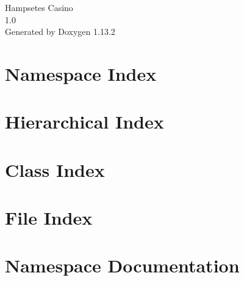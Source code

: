 \documentclass[twoside]{book}
\newcommand{\+}{\discretionary{\mbox{\scriptsize$\hookleftarrow$}}{}{}}
\newcommand{\clearemptydoublepage}{%
    \newpage{\pagestyle{empty}\cleardoublepage}%
  }
\begin{document}
  \raggedbottom
    \hypersetup{pageanchor=false,
                bookmarksnumbered=true,
                pdfencoding=unicode
               }
  \begin{titlepage}
  \vspace*{7cm}
  \begin{center}%
  {\Large Hampsetes Casino}\\
  [1ex]\large 1.\+0 \\
  \vspace*{1cm}
  {\large Generated by Doxygen 1.13.2}\\
  \end{center}
  \end{titlepage}
  \clearemptydoublepage
  \tableofcontents
  \clearemptydoublepage
  \hypersetup{pageanchor=true}
\chapter{Namespace Index}

\chapter{Hierarchical Index}

\chapter{Class Index}

\chapter{File Index}

\chapter{Namespace Documentation}


\end{document}

